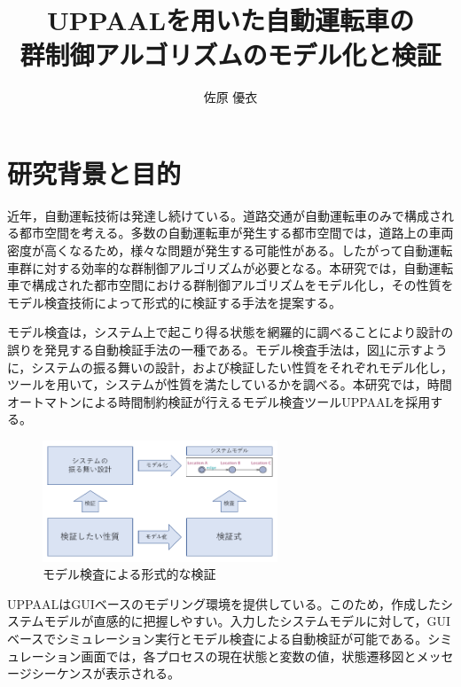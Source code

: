 \documentclass[10pt]{tpu-abst-utf}
\author{佐原 優衣}
\title{UPPAALを用いた自動運転車の\\群制御アルゴリズムのモデル化と検証}
\begin{document}
%
\maketitle
%
%
\section{研究背景と目的}
近年，自動運転技術は発達し続けている。道路交通が自動運転車のみで構成される都市空間を考える。多数の自動運転車が発生する都市空間では，道路上の車両密度が高くなるため，様々な問題が発生する可能性がある。したがって自動運転車群に対する効率的な群制御アルゴリズムが必要となる。本研究では，自動運転車で構成された都市空間における群制御アルゴリズムをモデル化し，その性質をモデル検査技術によって形式的に検証する手法を提案する。

モデル検査は，システム上で起こり得る状態を網羅的に調べることにより設計の誤りを発見する自動検証手法の一種である。モデル検査手法は，図\ref{ModelV}に示すように，システムの振る舞いの設計，および検証したい性質をそれぞれモデル化し，ツールを用いて，システムが性質を満たしているかを調べる。本研究では，時間オートマトンによる時間制約検証が行えるモデル検査ツールUPPAAL\cite{no1}を採用する。
	\begin{figure}[htb]
	\centering
	\includegraphics[width=70mm]{ModelVerification.png}
	\caption[9pt]{モデル検査による形式的な検証}
	\label{ModelV}
	\end{figure}

UPPAALはGUIベースのモデリング環境を提供している。このため，作成したシステムモデルが直感的に把握しやすい。入力したシステムモデルに対して，GUIベースでシミュレーション実行とモデル検査による自動検証が可能である。シミュレーション画面では，各プロセスの現在状態と変数の値，状態遷移図とメッセージシーケンスが表示される。
\end{document}
